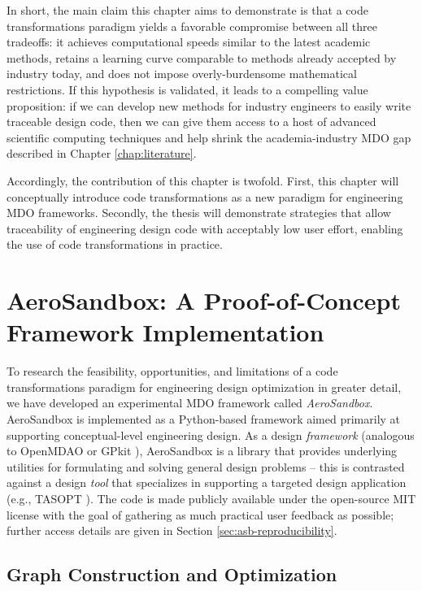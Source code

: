 In short, the main claim this chapter aims to demonstrate is that a code transformations paradigm yields a favorable compromise between all three tradeoffs: it achieves computational speeds similar to the latest academic methods, retains a learning curve comparable to methods already accepted by industry today, and does not impose overly-burdensome mathematical restrictions. If this hypothesis is validated, it leads to a compelling value proposition: if we can develop new methods for industry engineers to easily write traceable design code, then we can give them access to a host of advanced scientific computing techniques and help shrink the academia-industry MDO gap described in Chapter \ref{chap:literature}.

Accordingly, the contribution of this chapter is twofold. First, this chapter will conceptually introduce code transformations as a new paradigm for engineering MDO frameworks. Secondly, the thesis will demonstrate strategies that allow traceability of engineering design code with acceptably low user effort, enabling the use of code transformations in practice.

\section{AeroSandbox: A Proof-of-Concept Framework Implementation}
\label{sec:aerosandbox}

To research the feasibility, opportunities, and limitations of a code transformations paradigm for engineering design optimization in greater detail, we have developed an experimental MDO framework called \emph{AeroSandbox}. AeroSandbox is implemented as a Python-based framework aimed primarily at supporting conceptual-level engineering design. As a design \emph{framework} (analogous to OpenMDAO \cite{gray_openmdao_2019} or GPkit \cite{gpkit}), AeroSandbox is a library that provides underlying utilities for formulating and solving general design problems -- this is contrasted against a design \emph{tool} that specializes in supporting a targeted design application (e.g., TASOPT \cite{drela_tasopt_2010}). The code is made publicly available under the open-source MIT license with the goal of gathering as much practical user feedback as possible; further access details are given in Section \ref{sec:asb-reproducibility}.

\subsection{Graph Construction and Optimization}

